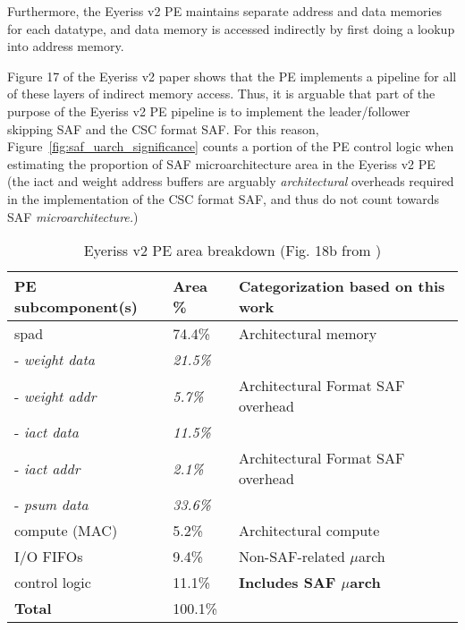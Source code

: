 Furthermore, the Eyeriss v2 PE maintains separate address and data memories for each datatype, and data memory is accessed indirectly by first doing a lookup into address memory\cite{eyerissv2}. 

Figure 17 of the Eyeriss v2 paper shows that the PE implements a pipeline for all of these layers of indirect memory access\cite{eyerissv2}. Thus, it is arguable that part of the purpose of the Eyeriss v2 PE pipeline is to implement the leader/follower skipping SAF and the CSC format SAF. For this reason, Figure~\ref{fig:saf_uarch_significance} counts a portion of the PE control logic when estimating the proportion of SAF microarchitecture area in the Eyeriss v2 PE (the iact and weight address buffers are arguably \textit{architectural} overheads required in the implementation of the CSC format SAF, and thus do not count towards SAF \textit{microarchitecture.})



\begin{table}
\caption{Eyeriss v2 PE area breakdown (Fig. 18b from \cite{eyerissv2})}
\label{tab:eyerissv2_pe_breakdown}
\label{arm:table}
\begin{center}
\begin{tabular}{||l|l|l||}\hline
\textbf{PE subcomponent(s)} & \textbf{Area} \%  & \textbf{Categorization based on this work}  \\\hline
spad	   & 74.4\% & Architectural memory \\\hline
- \textit{weight data}	   & \textit{21.5\%} &\\\hline
- \textit{weight addr}	   & \textit{5.7\%} & Architectural Format SAF overhead\\\hline
- \textit{iact data}	   & \textit{11.5\%} &\\\hline
- \textit{iact addr}	   & \textit{2.1\%} & Architectural Format SAF overhead \\\hline
- \textit{psum data}   & \textit{33.6\%} &\\\hline
compute (MAC)	   & 5.2\% & Architectural compute \\\hline
I/O FIFOs	   & 9.4\% & Non-SAF-related $\mu$arch\\\hline
control logic	   & 11.1\% & \textbf{Includes SAF $\mu$arch} \\\hline
\textbf{Total}	   & 100.1\% & \\\hline
\end{tabular}
\end{center}
\end{table}

